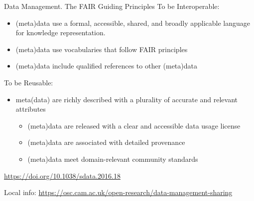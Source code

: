 \documentclass[ignorenonframetext,aspectratio=169,10pt,xcolor=table]{beamer}
\begin{document}
\begin{frame}{Data Management. The FAIR Guiding Principles} 
To be Interoperable:
\begin{itemize}
\item (meta)data use a formal, accessible, shared, and broadly applicable language for knowledge representation.
\item (meta)data use vocabularies that follow FAIR principles
\item (meta)data include qualified references to other (meta)data
\end{itemize}

To be Reusable:
\begin{itemize}
\item meta(data) are richly described with a plurality of accurate and relevant attributes
\begin{itemize}
\item (meta)data are released with a clear and accessible data usage license
\item (meta)data are associated with detailed provenance
\item (meta)data meet domain-relevant community standards
\end{itemize}
\end{itemize}

\begin{flushright}
{\tiny \url{https://doi.org/10.1038/sdata.2016.18}}
\end{flushright}


\begin{flushright}
{\tiny
Local info: \url{https://osc.cam.ac.uk/open-research/data-management-sharing}}
\end{flushright}

\end{frame}
\end{document}
